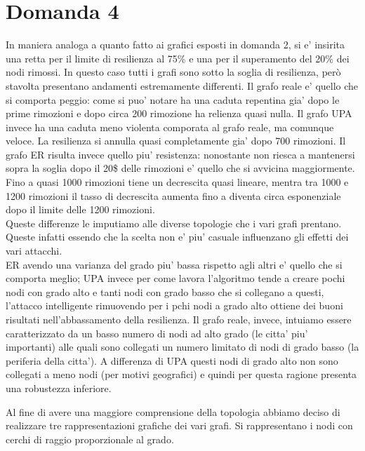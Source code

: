 \documentclass{article}
\begin{document}
\section{Domanda 4}
In maniera analoga a quanto fatto ai grafici esposti in domanda 2, si e' insirita una retta per il limite di resilienza al 75\% e una per il superamento del 20\% dei nodi rimossi.
In questo caso tutti i grafi sono sotto la soglia di resilienza, però stavolta presentano andamenti estremamente differenti.
Il grafo reale e' quello che si comporta peggio: come si puo' notare ha una caduta repentina gia' dopo le prime rimozioni e dopo circa 200 rimozione ha relienza quasi nulla.
Il grafo UPA invece ha una caduta meno violenta comporata al grafo reale, ma comunque veloce. La resilienza si annulla quasi completamente gia' dopo 700 rimozioni.
Il grafo ER risulta invece quello piu' resistenza: nonostante non riesca a mantenersi sopra la soglia dopo il 20\$ delle rimozioni e' quello che si avvicina maggiormente. Fino a quasi 1000 rimozioni tiene un decrescita quasi lineare, mentra tra 1000 e 1200 rimozioni il tasso di decrescita aumenta fino a diventa circa esponenziale dopo il limite delle 1200 rimozioni.\\
Queste differenze le imputiamo alle diverse topologie che i vari grafi prentano. Queste infatti essendo che la scelta non e' piu' casuale influenzano gli effetti dei vari attacchi.\\
ER avendo una varianza del grado piu' bassa rispetto agli altri e' quello che si comporta meglio; UPA invece per come lavora l'algoritmo tende a creare pochi nodi con grado alto e tanti nodi con grado basso che si collegano a questi, l'attacco intelligente rimuovendo per i pchi nodi a grado alto ottiene dei buoni risultati nell'abbassamento della resilienza.
Il grafo reale, invece, intuiamo essere caratterizzato da un basso numero di nodi ad alto grado (le citta' piu' importanti) alle quali sono collegati un numero limitato di nodi di grado basso (la periferia della citta'). A differenza di UPA questi nodi di grado alto non sono collegati a meno nodi (per motivi geografici) e quindi per questa ragione presenta una robustezza inferiore.

Al fine di avere una maggiore comprensione della topologia abbiamo deciso di realizzare tre rappresentazioni grafiche dei vari grafi. Si rappresentano i nodi con cerchi di raggio proporzionale al grado.
\end{document}
